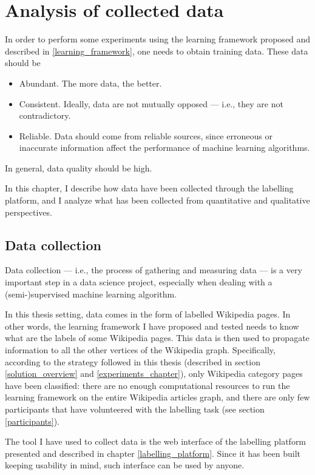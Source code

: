 \chapter{Analysis of collected data}\label{analysis_collected_data}
    In order to perform some experiments using the learning framework proposed and described in \ref{learning_framework}, one needs to obtain training data. These data should be
    \begin{itemize}
        \item Abundant. The more data, the better.
        \item Consistent. Ideally, data are not mutually opposed --- i.e., they are not contradictory.
        \item Reliable. Data should come from reliable sources, since erroneous or inaccurate information affect the performance of machine learning algorithms.
    \end{itemize}
    In general, data quality should be high.
    
    In this chapter, I describe how data have been collected through the labelling platform, and I analyze what has been collected from quantitative and qualitative perspectives.
    \section{Data collection}
        Data collection --- i.e., the process of gathering and measuring data --- is a very important step in a data science project, especially when dealing with a (semi-)supervised machine learning algorithm.
        
        In this thesis setting, data comes in the form of labelled Wikipedia pages. In other words, the learning framework I have proposed and tested needs to know what are the labels of some Wikipedia pages. This data is then used to propagate information to all the other vertices of the Wikipedia graph. Specifically, according to the strategy followed in this thesis (described in section \ref{solution_overview} and \ref{experiments_chapter}), only Wikipedia category pages have been classified: there are no enough computational resources to run the learning framework on the entire Wikipedia articles graph, and there are only few participants that have volunteered with the labelling task (see section \ref{participants}).
        
        The tool I have used to collect data is the web interface of the labelling platform presented and described in chapter \ref{labelling_platform}. Since it has been built keeping usability in mind, such interface can be used by anyone.
